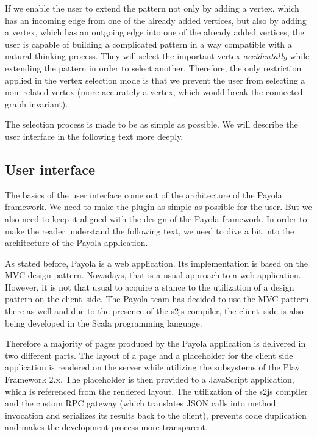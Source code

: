 If we enable the user to extend the pattern not only by adding a vertex, 
which has an incoming edge from one of the already added vertices, but also by adding 
a vertex, which has an outgoing edge into one of the already added vertices, 
the user is capable of building a complicated pattern in a way compatible with a natural thinking process.
They will select the
important vertex \emph{accidentally} while extending the 
pattern in order to select another. Therefore, the only restriction 
applied in the vertex selection mode is that we prevent the user from selecting 
a non--related vertex (more accurately a vertex, which would break the connected 
graph invariant).

The selection process is made to be as simple as possible. We will describe the 
user interface in the following text more deeply.

\subsection{User interface}
The basics of the user interface come out of the architecture of the Payola 
framework. We need to make the plugin as simple as possible for the user. But we 
also need to keep it aligned with the design of the Payola framework. In order to 
make the reader understand the following text, we need to dive a bit into the 
architecture of the Payola application.

As stated before, Payola is a web application. Its implementation is based on the MVC 
design pattern. Nowadays, that is a usual approach to a web application. However, it is not that usual 
to acquire a stance to the utilization of a design pattern on the client--side. The 
Payola team has decided to use the MVC pattern there as well and due to 
the presence of the s2js compiler, the client--side is also being developed in 
the Scala programming language.

Therefore a majority of pages produced by the Payola application is delivered 
in two different parts. The layout of a page and a placeholder for the client 
side application is rendered on the server while utilizing the subsystems of the 
Play Framework 2.x. The placeholder is then provided to a JavaScript application,
which is referenced from the rendered layout. The utilization of the s2js compiler and
the custom RPC gateway (which translates JSON calls into method invocation and serializes its results
back to the client), prevents code duplication and makes the development process more transparent.

